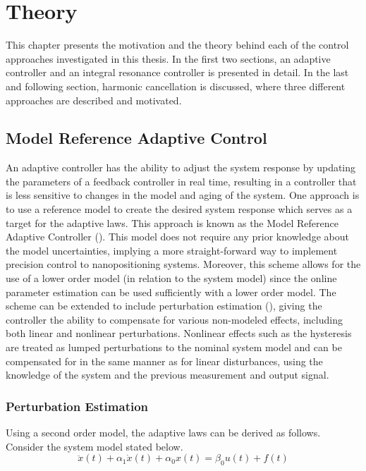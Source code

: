 \chapter{Theory}\label{cha:controlApproach}
This chapter presents the motivation and the theory behind each of the control approaches investigated in this thesis. In the first two sections, an adaptive controller and an integral resonance controller is presented in detail. In the last and following section, harmonic cancellation is discussed, where three different approaches are described and motivated.

\section{Model Reference Adaptive Control}
An adaptive controller has the ability to adjust the system response by updating the parameters of a feedback controller in real time, resulting in a controller that is less sensitive to changes in the model and aging of the system. One approach is to use a reference model to create the desired system response which serves as a target for the adaptive laws. This approach is known as the Model Reference Adaptive Controller (\abbrMRAC). This model does not require any prior knowledge about the model uncertainties, implying a more straight-forward way to implement precision control to nanopositioning systems. Moreover, this scheme allows for the use of a lower order model (in relation to the system model) since the online parameter estimation can be used sufficiently with a lower order model. The \abbrMRAC scheme can be extended to include perturbation estimation (\abbrMRACPE), giving the controller the ability to compensate for various non-modeled effects, including both linear and nonlinear perturbations. Nonlinear effects such as the hysteresis are treated as lumped perturbations to the nominal system model and can be compensated for in the same manner as for linear disturbances, using the knowledge of the system and the previous measurement and output signal.

\subsection{Perturbation Estimation}\label{sec:pertest}
Using a second order model, the adaptive laws can be derived as follows. Consider the system model stated below.
\begin{equation}
  \label{eq:sysmodel}
  \ddot{x}(t) + \alpha_1\dot{x}(t) +  \alpha_0x(t) = \beta_0u(t) + f(t)
\end{equation}


